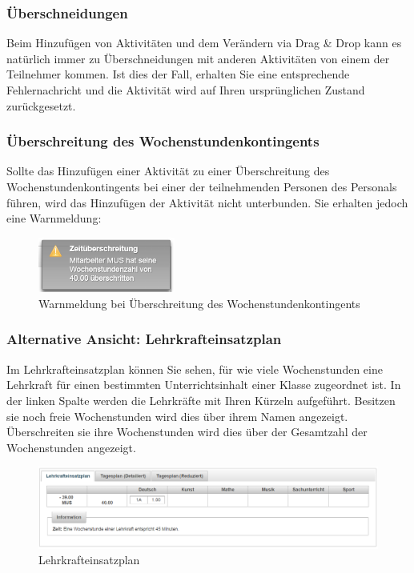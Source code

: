 \documentclass[fontsize=12pt]{scrartcl}
\begin{document}
\subsubsection{Überschneidungen}
Beim Hinzufügen von Aktivitäten und dem Verändern via Drag \& Drop kann es natürlich immer zu Überschneidungen mit anderen Aktivitäten von einem der Teilnehmer kommen. Ist dies der Fall, erhalten Sie eine entsprechende Fehlernachricht und die Aktivität wird auf Ihren ursprünglichen Zustand zurückgesetzt.

\subsubsection{Überschreitung des Wochenstundenkontingents}
Sollte das Hinzufügen einer Aktivität zu einer Überschreitung des Wochenstundenkontingents bei einer der teilnehmenden Personen des Personals führen, wird das Hinzufügen der Aktivität nicht unterbunden. Sie erhalten jedoch eine Warnmeldung: 

\begin{figure}[H]
\centering
\includegraphics[width=0.4\textwidth]{images/warning.png}
\caption{Warnmeldung bei Überschreitung des Wochenstundenkontingents}
\end{figure}


\subsubsection{Alternative Ansicht: Lehrkrafteinsatzplan}

Im Lehrkrafteinsatzplan können Sie sehen, für wie viele Wochenstunden eine Lehrkraft für einen bestimmten Unterrichtsinhalt einer Klasse zugeordnet ist. In der linken Spalte werden die Lehrkräfte mit Ihren Kürzeln aufgeführt. Besitzen sie noch freie Wochenstunden wird dies über ihrem Namen angezeigt. Überschreiten sie ihre Wochenstunden wird dies über der Gesamtzahl der Wochenstunden angezeigt. \\

\begin{figure}[H]
\centering
\includegraphics[width=\textwidth]{images/alternativeView1.png}
\caption{Lehrkrafteinsatzplan}
\end{figure}
\end{document}
